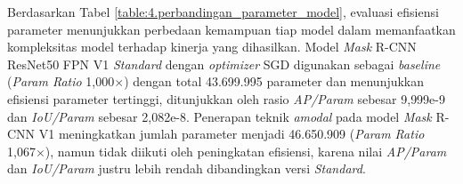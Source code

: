 \begin{table}[H]
\centering
\caption{Hasil Perbandingan Evaluasi Model Terbaik per Parameter}
\label{table:4.perbandingan_parameter_model}
\small
{}
\end{table}

Berdasarkan Tabel \ref{table:4.perbandingan_parameter_model}, evaluasi efisiensi parameter menunjukkan perbedaan kemampuan tiap model dalam memanfaatkan kompleksitas model terhadap kinerja yang dihasilkan. Model \textit{Mask} R-CNN ResNet50 FPN V1 \textit{Standard} dengan \textit{optimizer} SGD digunakan sebagai \textit{baseline} (\textit{Param Ratio} 1{,}000$\times$) dengan total 43.699.995 parameter dan menunjukkan efisiensi parameter tertinggi, ditunjukkan oleh rasio \textit{AP/Param} sebesar 9{,}999e-9 dan \textit{IoU/Param} sebesar 2{,}082e-8. Penerapan teknik \textit{amodal} pada model \textit{Mask} R-CNN V1 meningkatkan jumlah parameter menjadi 46.650.909 (\textit{Param Ratio} 1{,}067$\times$), namun tidak diikuti oleh peningkatan efisiensi, karena nilai \textit{AP/Param} dan \textit{IoU/Param} justru lebih rendah dibandingkan versi \textit{Standard}. \par


